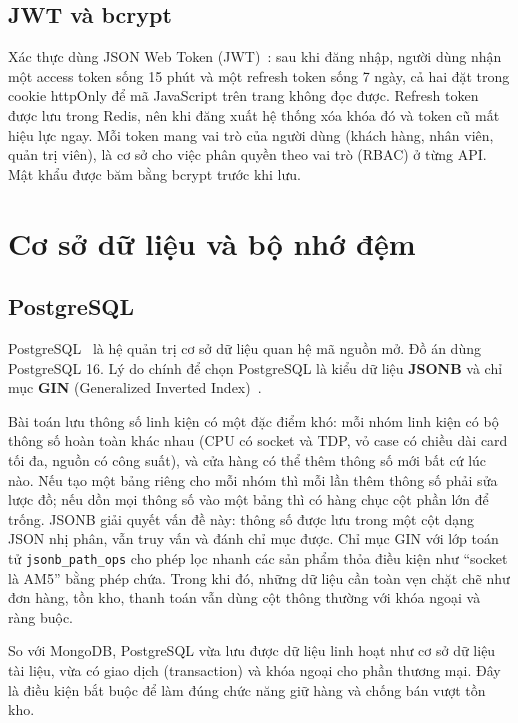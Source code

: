 \subsection{JWT và bcrypt}

Xác thực dùng JSON Web Token (JWT)~\cite{jwt}: sau khi đăng nhập, người dùng nhận một access token sống 15 phút và một refresh token sống 7 ngày, cả hai đặt trong cookie httpOnly để mã JavaScript trên trang không đọc được. Refresh token được lưu trong Redis, nên khi đăng xuất hệ thống xóa khóa đó và token cũ mất hiệu lực ngay. Mỗi token mang vai trò của người dùng (khách hàng, nhân viên, quản trị viên), là cơ sở cho việc phân quyền theo vai trò (RBAC) ở từng API. Mật khẩu được băm bằng bcrypt trước khi lưu.

\section{Cơ sở dữ liệu và bộ nhớ đệm}

\subsection{PostgreSQL}

PostgreSQL~\cite{postgresql} là hệ quản trị cơ sở dữ liệu quan hệ mã nguồn mở. Đồ án dùng PostgreSQL 16. Lý do chính để chọn PostgreSQL là kiểu dữ liệu \textbf{JSONB} và chỉ mục \textbf{GIN} (Generalized Inverted Index)~\cite{pg-jsonb}.

Bài toán lưu thông số linh kiện có một đặc điểm khó: mỗi nhóm linh kiện có bộ thông số hoàn toàn khác nhau (CPU có socket và TDP, vỏ case có chiều dài card tối đa, nguồn có công suất), và cửa hàng có thể thêm thông số mới bất cứ lúc nào. Nếu tạo một bảng riêng cho mỗi nhóm thì mỗi lần thêm thông số phải sửa lược đồ; nếu dồn mọi thông số vào một bảng thì có hàng chục cột phần lớn để trống. JSONB giải quyết vấn đề này: thông số được lưu trong một cột dạng JSON nhị phân, vẫn truy vấn và đánh chỉ mục được. Chỉ mục GIN với lớp toán tử \texttt{jsonb\_path\_ops} cho phép lọc nhanh các sản phẩm thỏa điều kiện như ``socket là AM5'' bằng phép chứa. Trong khi đó, những dữ liệu cần toàn vẹn chặt chẽ như đơn hàng, tồn kho, thanh toán vẫn dùng cột thông thường với khóa ngoại và ràng buộc.

So với MongoDB, PostgreSQL vừa lưu được dữ liệu linh hoạt như cơ sở dữ liệu tài liệu, vừa có giao dịch (transaction) và khóa ngoại cho phần thương mại. Đây là điều kiện bắt buộc để làm đúng chức năng giữ hàng và chống bán vượt tồn kho.

